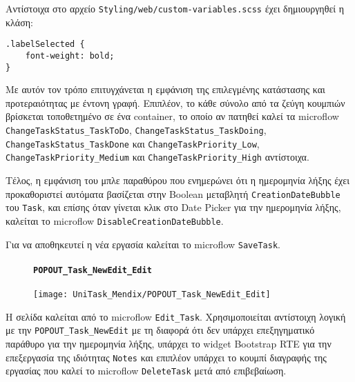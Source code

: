 Αντίστοιχα στο αρχείο \verb|Styling/web/custom-variables.scss| έχει δημιουργηθεί η κλάση:
                \begin{lstlisting}[mystyle]
.labelSelected {
    font-weight: bold;
}                \end{lstlisting}

                Με αυτόν τον τρόπο επιτυγχάνεται η εμφάνιση της επιλεγμένης κατάστασης και προτεραιότητας με έντονη γραφή. Επιπλέον, το κάθε σύνολο από τα ζεύγη κουμπιών βρίσκεται τοποθετημένο σε ένα container, το οποίο αν πατηθεί καλεί τα microflow \texttt{ChangeTaskStatus\_TaskToDo}, \texttt{ChangeTaskStatus\_TaskDoing}, \texttt{ChangeTaskStatus\_}\linebreak\texttt{TaskDone} και \texttt{ChangeTaskPriority\_Low}, \texttt{ChangeTaskPriority\_Medium} και \linebreak \texttt{ChangeTaskPriority\_High} αντίστοιχα.

                Τέλος, η εμφάνιση του μπλε παραθύρου που ενημερώνει ότι η ημερομηνία λήξης έχει προκαθοριστεί αυτόματα βασίζεται στην Boolean μεταβλητή \texttt{CreationDateBubble} του \texttt{Task}, και επίσης όταν γίνεται κλικ στο Date Picker για την ημερομηνία λήξης, καλείται το microflow  \texttt{DisableCreationDateBubble}.

                Για να αποθηκευτεί η νέα εργασία καλείται το microflow \texttt{SaveTask}.

                \begin{figure}[H] \noindent
                    \paragraph{\texttt{POPOUT\_Task\_NewEdit\_Edit}}
                    \begin{center}
                        \texttt{[image: UniTask\_Mendix/POPOUT\_Task\_NewEdit\_Edit]}
                    \end{center}
                \end{figure}

                Η σελίδα καλείται από το microflow \texttt{Edit\_Task}. Χρησιμοποιείται αντίστοιχη λογική με την \texttt{POPOUT\_Task\_NewEdit} με τη διαφορά ότι δεν υπάρχει επεξηγηματικό παράθυρο για την ημερομηνία λήξης, υπάρχει το widget Bootstrap RTE για την επεξεργασία της ιδιότητας \texttt{Notes} και επιπλέον υπάρχει το κουμπί διαγραφής της εργασίας που καλεί το microflow \texttt{DeleteTask} μετά από επιβεβαίωση.


